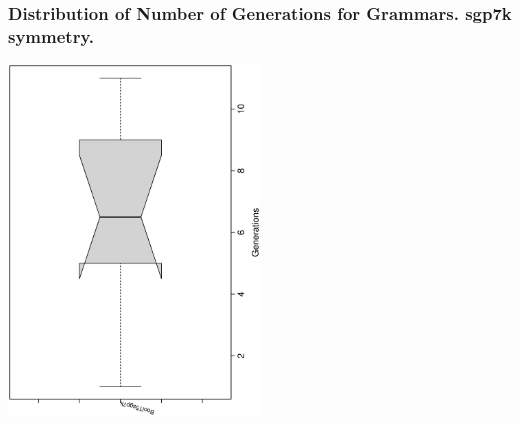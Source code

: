  \begin{frame}
 \frametitle{ Distribution of Number of Generations for Grammars. sgp7k  symmetry. }
 \begin{center}
\includegraphics[width=0.5\textwidth, angle=-90]
{ExpFboxplottGenerations005.eps}
 \end{center}
 \label{ExpFboxplottGenerations005.eps}  
 \end{frame}

